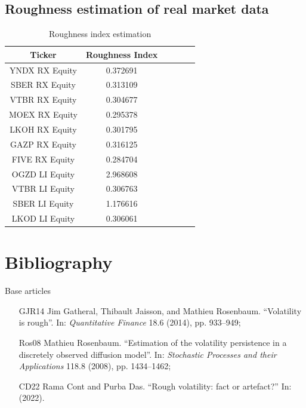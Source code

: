         \subsection{Roughness estimation of real market data}
            \begin{frame}
                \begin{table}[h]
                    \centering
                    \begin{tabular}{|c|c|c|c|c|c|}
                        \hline
                        Ticker &  Roughness Index\\\hline
                        \hline
                        YNDX RX Equity & 0.372691\\\hline
                        SBER RX Equity & 0.313109\\\hline
                        VTBR RX Equity & 0.304677\\\hline
                        MOEX RX Equity & 0.295378\\\hline
                        LKOH RX Equity & 0.301795\\\hline
                        GAZP RX Equity & 0.316125\\\hline
                        FIVE RX Equity & 0.284704\\\hline
                        \hline
                        OGZD LI Equity & \alert{2.968608}\\\hline
                        VTBR LI Equity & 0.306763\\\hline
                        SBER LI Equity & \alert{1.176616}\\\hline
                        LKOD LI Equity & 0.306061\\\hline
                    \end{tabular}
                    \caption{Roughness index estimation}
                    \label{tab:roughness_index}
                \end{table}
            \end{frame}

        \section*{Bibliography}
            \begin{frame}{Base articles}
                \begin{itemize}
                    \item[GJR14] Jim Gatheral, Thibault Jaisson, and Mathieu Rosenbaum. “Volatility is rough”. In: \emph{Quantitative Finance} 18.6 (2014), pp. 933–949;
                    \item[Ros08] Mathieu Rosenbaum. “Estimation of the volatility persistence in a discretely observed diffusion model”. In: \emph{Stochastic Processes and their Applications} 118.8 (2008), pp. 1434–1462;
                    \item[CD22]  Rama Cont and Purba Das. “Rough volatility: fact or artefact?” In: (2022).
                \end{itemize}
            \end{frame}
